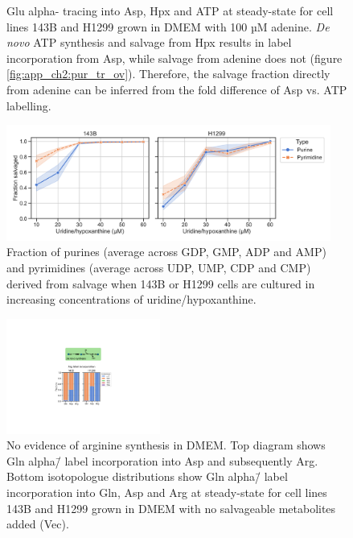\begin{figure}[ht]
\begin{subfigure}[b]{0.4\textwidth}
         \caption{}
         \label{fig:app_ch2:ade_sal_H1299}
     \end{subfigure}
        \caption[Glu alpha-\hNi{} tracing into Asp, Hpx and ATP.]{
        Glu alpha-\hNi{} tracing into Asp, Hpx and ATP at steady-state for cell lines 143B and H1299 grown in DMEM with 100 µM adenine.
        \textit{De novo} ATP synthesis and salvage from Hpx results in label incorporation from Asp, while salvage from adenine does not (figure \ref{fig:app_ch2:pur_tr_ov}).
        Therefore, the salvage fraction directly from adenine can be inferred from the fold difference of Asp vs. ATP labelling.
        }
        \label{fig:app_ch2:ade_sal}
\end{figure}

\begin{figure}[ht]
    \centering
    \includegraphics[width=0.95\textwidth]{figures/chap2/app/sal_frac_conc.pdf}
    \caption[Salvage as a function of Urd/Hpx concentration.]{
    Fraction of purines (average across GDP, GMP, ADP and AMP) and pyrimidines (average across UDP, UMP, CDP and CMP) derived from salvage when 143B or H1299 cells are cultured in increasing concentrations of uridine/hypoxanthine.
    }
    \label{fig:app_ch2:sal_frac_conc}
\end{figure}

\begin{figure}[ht]
    \centering
    \includegraphics[width=0.45\textwidth]{figures/chap2/app/arg_syn.pdf}
    \caption[No evidence of arginine synthesis in DMEM.]{
    No evidence of arginine synthesis in DMEM.
    Top diagram shows Gln alpha\=/\hNi{} label incorporation into Asp and subsequently Arg.
    Bottom isotopologue distributions show Gln alpha\=/\hNi{} label incorporation into Gln, Asp and Arg at steady-state for cell lines 143B and H1299 grown in DMEM with no salvageable metabolites added (Vec).
    }
    \label{fig:app_ch2:arg_syn}
\end{figure}




